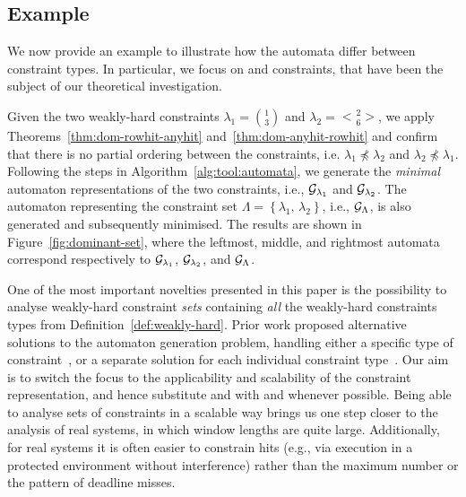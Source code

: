 \subsection{Example}%
\label{sec:tool:example}%
%
We now provide an example to illustrate how the automata differ between constraint types. 
In particular, we focus on \tAH{} and \tRH{} constraints, that have been the subject of our theoretical investigation. 

Given the two weakly-hard constraints $\lambda_1 = \binom{1}{3}$ and $\lambda_2 = \genfrac{<}{>}{0pt}{}{2}{6}$, we apply Theorems~\ref{thm:dom-rowhit-anyhit} and~\ref{thm:dom-anyhit-rowhit} and confirm that there is no partial ordering between the constraints, i.e. $\lambda_1 \npreceq \lambda_2$ and $\lambda_2 \npreceq \lambda_1$.
Following the steps in Algorithm~\ref{alg:tool:automata}, we generate the \emph{minimal} automaton representations of the two constraints, i.e., $\mathcal{G}_{\lambda_1}$ and $\mathcal{G}_{\lambda_2}$.
The automaton representing the constraint set $\Lambda = \left\{ \lambda_1,\, \lambda_2 \right\}$, i.e., $\mathcal{G}_{\Lambda}$, is also generated and subsequently minimised.
The results are shown in Figure~\ref{fig:dominant-set}, where the leftmost, middle, and rightmost automata correspond respectively to $\mathcal{G}_{\lambda_1}$, $\mathcal{G}_{\lambda_2}$, and $\mathcal{G}_{\Lambda}$.

One of the most important novelties presented in this paper is the possibility to analyse weakly-hard constraint \emph{sets} containing \emph{all} the weakly-hard constraints types from Definition~\ref{def:weakly-hard}. 
Prior work proposed alternative solutions to the automaton generation problem, handling either a specific type of constraint~\cite{Horssen:2016}, or a separate solution for each individual constraint type~\cite{Linsenmayer:2017}.
Our aim is to switch the focus to the applicability and scalability of the constraint representation, and hence substitute \tAH{} and \tAM{} with \tRH{} and \tRM{} whenever possible.
Being able to analyse sets of constraints in a scalable way brings us one step closer to the analysis of real systems, in which window lengths are quite large.
Additionally, for real systems it is often easier to constrain hits (e.g., via execution in a protected environment without interference) rather than the maximum number or the pattern of deadline misses.


